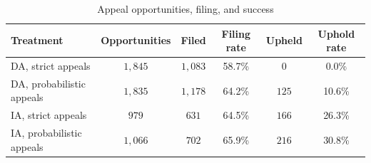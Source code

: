 \begin{table}[htbp]
\centering
\caption{Appeal opportunities, filing, and success}
\label{tab:appeal_opportunities_rep}
\begin{tabular}{lccccc}
\toprule
Treatment & Opportunities & Filed & Filing rate & Upheld & Uphold rate \\
\midrule
DA, strict appeals & \(1{,}845\) & \(1{,}083\) & 58.7\% & \(0\) & 0.0\% \\
DA, probabilistic appeals & \(1{,}835\) & \(1{,}178\) & 64.2\% & \(125\) & 10.6\% \\
IA, strict appeals & \(979\) & \(631\) & 64.5\% & \(166\) & 26.3\% \\
IA, probabilistic appeals & \(1{,}066\) & \(702\) & 65.9\% & \(216\) & 30.8\% \\
\bottomrule
\end{tabular}
\end{table}
